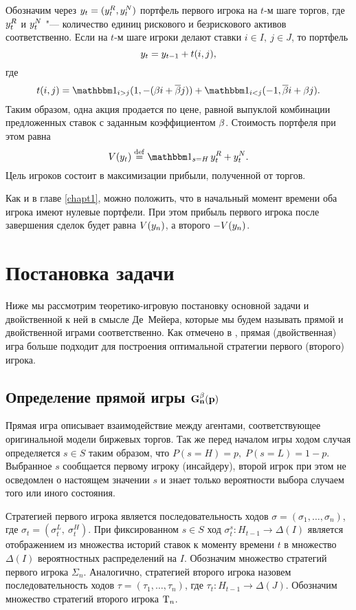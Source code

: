 {Обозначим через $y_{t} = (y_{t}^R, y_{t}^N)$ портфель первого игрока на $t$-м шаге торгов, где $y_{t}^R$ и $y_{t}^N$ "--- количество единиц рискового и безрискового активов соответственно.
Если на $t$-м шаге игроки делают ставки $i \in I,\ j \in J$, то портфель 
\[
y_{t} = y_{t-1} + t(i, j),
\]
где
\begin{equation}\label{ch2:eq:trans-mech}
  t(i, j) = \Ind{i > j} (1, -(\Co i + \DCo j)) +
  \Ind{i < j} (-1, \DCo i + \Co j).
\end{equation}
Таким образом, одна акция продается по цене, равной выпуклой комбинации предложенных ставок с заданным коэффициентом $\beta$.
Стоимость портфеля при этом равна
\begin{equation*}
  V(\Port{t}) \eqdef \Ind{s = H} \, \Port{t}^R + \Port{t}^N.
\end{equation*}
Цель игроков состоит в максимизации прибыли, полученной от торгов.

Как и в главе \ref{chapt1}, можно положить, что в начальный момент времени оба игрока имеют нулевые портфели.
При этом прибыль первого игрока после завершения сделок будет равна $V(y_{n})$, а второго $-V(y_{n})$.

\section{Постановка задачи}
\label{ch2:sec:formal-descr}

Ниже мы рассмотрим теоретико-игровую постановку основной задачи и двойственной к ней в смысле Де~Мейера, которые мы будем называть прямой и двойственной играми соответственно.
Как отмечено в \cite{demeyer02}, прямая (двойственная) игра больше подходит для построения оптимальной стратегии первого (второго) игрока.

\subsection{Определение прямой игры $\mathbf{G^{\beta}_n(p)}$}
Прямая игра описывает взаимодействие между агентами, соответствующее оригинальной модели биржевых торгов.
Так же перед началом игры ходом случая определяется $s \in S$ таким образом, что $P(s = H) = p, \; P(s = L) = 1-p$.
Выбранное $s$ сообщается первому игроку (инсайдеру), второй игрок при этом не осведомлен о настоящем значении $s$ и знает только вероятности выбора случаем того или иного состояния.

Стратегией первого игрока является последовательность ходов $\sigma = (\sigma_1, \ldots, \sigma_n)$, где $\sigma_t = (\sigma^L_t,\ \sigma^H_t)$.
При фиксированном $s \in S$ ход $\sigma^s_t: H_{t-1} \rightarrow \Delta(I)$ является отображением из множества историй ставок к моменту времени $t$ в множество $\Delta(I)$ вероятностных распределений на $I$.
Обозначим множество стратегий первого игрока $\Sigma_n$.
Аналогично, стратегией второго игрока назовем последовательность ходов $\tau = (\tau_1, \ldots, \tau_n)$, где $\tau_t: H_{t-1} \rightarrow \Delta(J)$.
Обозначим множество стратегий второго игрока $\mathrm{T}_n$.

}
